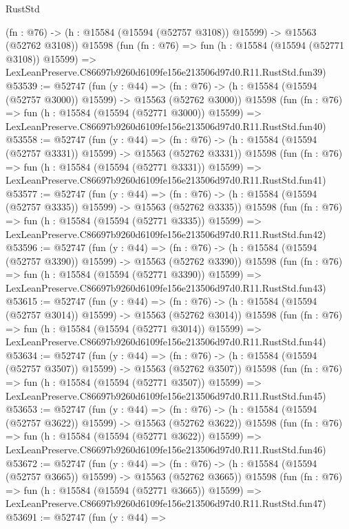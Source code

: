 \begin{lexlean}{RustStd}
\begin{coremodule}
    (fn : @76) -> (h : @15584 (@15594 (@52757 @3108)) @15599) -> @15563 (@52762 @3108))
    @15598
    (fun (fn : @76) =>
    fun (h : @15584 (@15594 (@52771 @3108)) @15599) =>
    LexLeanPreserve.C86697b9260d6109fe156e213506d97d0.R11.RustStd.fun39)
@53539 := @52747
    (fun (y : @44) =>
    (fn : @76) -> (h : @15584 (@15594 (@52757 @3000)) @15599) -> @15563 (@52762 @3000))
    @15598
    (fun (fn : @76) =>
    fun (h : @15584 (@15594 (@52771 @3000)) @15599) =>
    LexLeanPreserve.C86697b9260d6109fe156e213506d97d0.R11.RustStd.fun40)
@53558 := @52747
    (fun (y : @44) =>
    (fn : @76) -> (h : @15584 (@15594 (@52757 @3331)) @15599) -> @15563 (@52762 @3331))
    @15598
    (fun (fn : @76) =>
    fun (h : @15584 (@15594 (@52771 @3331)) @15599) =>
    LexLeanPreserve.C86697b9260d6109fe156e213506d97d0.R11.RustStd.fun41)
@53577 := @52747
    (fun (y : @44) =>
    (fn : @76) -> (h : @15584 (@15594 (@52757 @3335)) @15599) -> @15563 (@52762 @3335))
    @15598
    (fun (fn : @76) =>
    fun (h : @15584 (@15594 (@52771 @3335)) @15599) =>
    LexLeanPreserve.C86697b9260d6109fe156e213506d97d0.R11.RustStd.fun42)
@53596 := @52747
    (fun (y : @44) =>
    (fn : @76) -> (h : @15584 (@15594 (@52757 @3390)) @15599) -> @15563 (@52762 @3390))
    @15598
    (fun (fn : @76) =>
    fun (h : @15584 (@15594 (@52771 @3390)) @15599) =>
    LexLeanPreserve.C86697b9260d6109fe156e213506d97d0.R11.RustStd.fun43)
@53615 := @52747
    (fun (y : @44) =>
    (fn : @76) -> (h : @15584 (@15594 (@52757 @3014)) @15599) -> @15563 (@52762 @3014))
    @15598
    (fun (fn : @76) =>
    fun (h : @15584 (@15594 (@52771 @3014)) @15599) =>
    LexLeanPreserve.C86697b9260d6109fe156e213506d97d0.R11.RustStd.fun44)
@53634 := @52747
    (fun (y : @44) =>
    (fn : @76) -> (h : @15584 (@15594 (@52757 @3507)) @15599) -> @15563 (@52762 @3507))
    @15598
    (fun (fn : @76) =>
    fun (h : @15584 (@15594 (@52771 @3507)) @15599) =>
    LexLeanPreserve.C86697b9260d6109fe156e213506d97d0.R11.RustStd.fun45)
@53653 := @52747
    (fun (y : @44) =>
    (fn : @76) -> (h : @15584 (@15594 (@52757 @3622)) @15599) -> @15563 (@52762 @3622))
    @15598
    (fun (fn : @76) =>
    fun (h : @15584 (@15594 (@52771 @3622)) @15599) =>
    LexLeanPreserve.C86697b9260d6109fe156e213506d97d0.R11.RustStd.fun46)
@53672 := @52747
    (fun (y : @44) =>
    (fn : @76) -> (h : @15584 (@15594 (@52757 @3665)) @15599) -> @15563 (@52762 @3665))
    @15598
    (fun (fn : @76) =>
    fun (h : @15584 (@15594 (@52771 @3665)) @15599) =>
    LexLeanPreserve.C86697b9260d6109fe156e213506d97d0.R11.RustStd.fun47)
@53691 := @52747
    (fun (y : @44) =>

\end{coremodule}
\end{lexlean}
